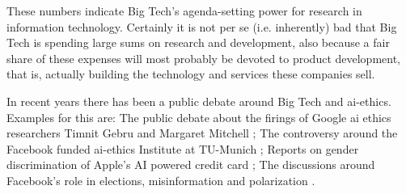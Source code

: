These numbers indicate Big Tech's agenda-setting power for research in  information technology.
Certainly it is not per se (i.e. inherently) bad that Big Tech is spending large sums on research and development, also because a fair share of these expenses will most probably be devoted to product development, that is, actually building the technology and services these companies sell.

In recent years there has been a public debate around Big Tech and \gls{ai}-ethics.
Examples for this are: The public debate about the firings of Google \gls{ai} ethics researchers Timnit Gebru and Margaret Mitchell \citep{timnit_gebru_i_2020, simonite_prominent_2020, agency_google_2021, noauthor_margaret_2021}; 
The controversy around the Facebook funded \gls{ai}-ethics Institute at TU-Munich \citep{kover_warum_2019, kreiss_vielsagender_2019, kreye_facebook_2019, hauck_facebook_2019, thiel_kommentar_2019};
Reports on gender discrimination of Apple's AI powered credit card \citep{heinemeier_hansson_dhh_2019, vigdor_apple_2019, hegemann_apple_2019, mahdawi_apples_2019};
The discussions around Facebook's role in elections, misinformation and polarization \citep{seetharaman_facebook_2020, kates_facebook_2017, klein_what_2020, boxell_cross-country_2020, newton_how_2020, rosen_smart_2019}.

